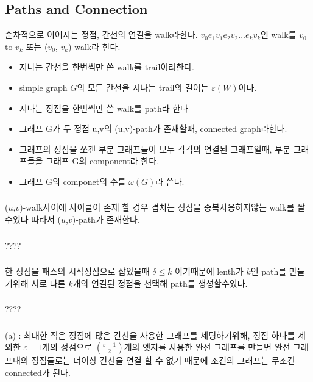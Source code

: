 \documentclass{oblivoir}
\begin{document}
\subsection{Paths and Connection}
\begin{dfn}[walk]순차적으로 이어지는 정점, 간선의 연결을 walk라한다. $v_{0}e_{1}v_{1}e_{2}v_{2} ... e_{k}v_{k}$인 walk를 $v_0$ to $v_k$ 또는 ($v_0$, $v_k$)-walk라 한다.
    \begin{itemize}
        \item 지나는 간선을 한번씩만 쓴 walk를 trail이라한다.
        \item simple graph $G$의 모든 간선을 지나는 trail의 길이는 $\varepsilon (W)$이다.
        \item 지나는 정점을 한번씩만 쓴 walk를 path라 한다
        \item 그래프 G가 두 정점 u,v의  (u,v)-path가 존재할때, connected graph라한다.
        \item 그래프의 정점을 쪼갠 부분 그래프들이 모두 각각의 연결된 그래프일때, 부분 그래프들을 그래프 G의 component라 한다.
        \item 그래프 G의 componet의 수를 $\omega(G)$라 쓴다.
    \end{itemize}
\end{dfn}
\subsubsection{} 

($u$,$v$)-walk사이에 사이클이 존재 할 경우 겹치는 정점을 중복사용하지않는 walk를 짤수있다 따라서 ($u$,$v$)-path가 존재한다.
\subsubsection{} 
????

\subsubsection{} 
한 정점을 패스의 시작정점으로 잡았을때 $\delta \le k$ 이기때문에  lenth가 $k$인 path를 만들기위해 서로 다른 $k$개의 연결된 정점을 선택해 path를 생성할수있다.
\subsubsection{} 
????
\subsubsection{} 
(a) : 최대한 적은 정점에 많은 간선을 사용한 그래프를 세팅하기위해,  정점 하나를 제외한 $\varepsilon-1$개의 정점으로 ${\varepsilon-1 \choose 2}$개의 엣지를 사용한 완전 그래프를 만들면 완전 그래프내의 정점들로는 더이상 간선을 연결 할 수 없기 때문에 조건의 그래프는 무조건 connected가 된다.
\end{document}
